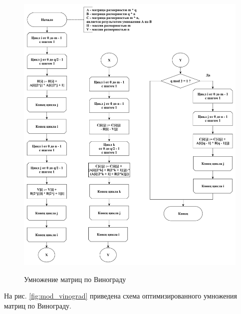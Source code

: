 \documentclass[a4paper,12pt]{article}
\begin{document}
\begin{figure}[h!]
	\begin{center}
		{\includegraphics[width = \textwidth]{vinograd.pdf}}
		\caption{
			Умножение матриц по Винограду}
		\label{fig:vinograd}
	\end{center}
\end{figure}

На рис. \ref{fig:mod_vinograd} приведена схема оптимизированного
умножения матриц по Винограду.
\end{document}
